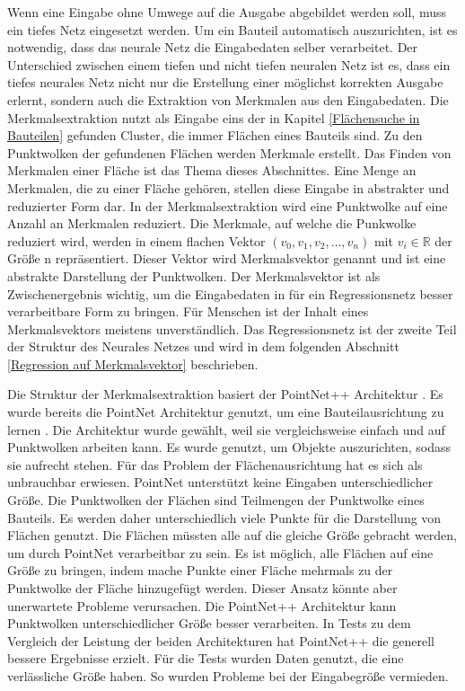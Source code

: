 Wenn eine Eingabe ohne Umwege auf die Ausgabe abgebildet werden soll, muss ein tiefes Netz eingesetzt werden. Um ein Bauteil automatisch auszurichten, ist es notwendig, dass das neurale Netz die Eingabedaten selber verarbeitet.
Der Unterschied zwischen einem tiefen und nicht tiefen neuralen Netz ist es, dass ein tiefes neurales Netz nicht nur die Erstellung einer möglichst korrekten Ausgabe erlernt, sondern auch die Extraktion von Merkmalen aus den Eingabedaten.
Die Merkmalsextraktion nutzt als Eingabe eins der in Kapitel \ref{Flächensuche in  Bauteilen} gefunden Cluster, die immer Flächen eines Bauteils sind. Zu den Punktwolken der gefundenen Flächen werden Merkmale erstellt. Das Finden von Merkmalen einer Fläche ist das Thema dieses Abschnittes.
Eine Menge an Merkmalen, die zu einer Fläche gehören, stellen diese Eingabe in abstrakter und reduzierter Form dar.
In der Merkmalsextraktion wird eine Punktwolke auf eine Anzahl an Merkmalen reduziert. Die Merkmale, auf welche die Punkwolke reduziert wird, werden in einem flachen Vektor $(v_{0},v_{1},v_{2},\ldots,v_{n})$ mit $v_{i} \in \mathbb{R}$ der Größe n repräsentiert.
Dieser Vektor wird Merkmalsvektor genannt und ist eine abstrakte Darstellung der Punktwolken. Der Merkmalsvektor ist als Zwischenergebnis wichtig, um die Eingabedaten in für ein Regressionsnetz besser verarbeitbare Form zu bringen. Für Menschen ist der Inhalt eines Merkmalsvektors meistens unverständlich.
Das Regressionsnetz ist der zweite Teil der Struktur des Neurales Netzes und wird in dem folgenden Abschnitt \ref{Regression auf Merkmalsvektor} beschrieben.

\smallskip

Die Struktur der Merkmalsextraktion basiert der PointNet++ Architektur \cite{PointNet++}. Es wurde bereits die PointNet Architektur genutzt, um eine Bauteilausrichtung zu lernen \cite{Datensatz}. Die Architektur wurde gewählt, 
weil sie vergleichsweise einfach und auf Punktwolken arbeiten kann. Es wurde genutzt, um Objekte auszurichten, sodass sie aufrecht stehen. Für das Problem der Flächenausrichtung hat es sich als unbrauchbar erwiesen. 
PointNet unterstützt keine Eingaben unterschiedlicher Größe. Die Punktwolken der Flächen sind Teilmengen der Punktwolke eines Bauteils. Es werden daher unterschiedlich viele Punkte für die Darstellung von Flächen genutzt. 
Die Flächen müssten alle auf die gleiche Größe gebracht werden, um durch PointNet verarbeitbar zu sein. Es ist möglich, alle Flächen auf eine Größe zu bringen, indem mache Punkte einer Fläche mehrmals zu der Punktwolke der Fläche hinzugefügt werden. 
Dieser Ansatz könnte aber unerwartete Probleme verursachen. Die PointNet++ Architektur kann Punktwolken unterschiedlicher Größe besser verarbeiten. In Tests zu dem Vergleich der Leistung der beiden Architekturen hat PointNet++ die generell bessere Ergebnisse erzielt.
Für die Tests wurden Daten genutzt, die eine verlässliche Größe haben. So wurden Probleme bei der Eingabegröße vermieden. 

